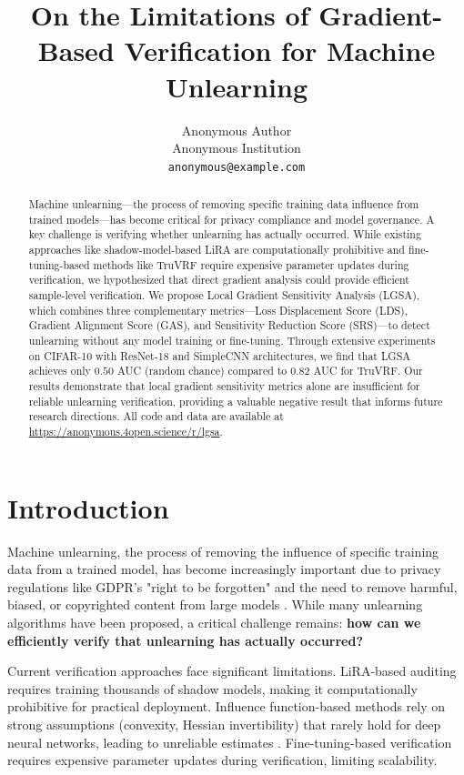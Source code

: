 \documentclass{article}
\title{On the Limitations of Gradient-Based Verification for Machine Unlearning}
\author{%
  Anonymous Author\\
  Anonymous Institution\\
  \texttt{anonymous@example.com}
}
\begin{document}
\maketitle

\begin{abstract}
Machine unlearning---the process of removing specific training data influence from trained models---has become critical for privacy compliance and model governance. A key challenge is verifying whether unlearning has actually occurred. While existing approaches like shadow-model-based LiRA are computationally prohibitive and fine-tuning-based methods like TruVRF require expensive parameter updates during verification, we hypothesized that direct gradient analysis could provide efficient sample-level verification. We propose Local Gradient Sensitivity Analysis (LGSA), which combines three complementary metrics---Loss Displacement Score (LDS), Gradient Alignment Score (GAS), and Sensitivity Reduction Score (SRS)---to detect unlearning without any model training or fine-tuning. Through extensive experiments on CIFAR-10 with ResNet-18 and SimpleCNN architectures, we find that LGSA achieves only $0.50$ AUC (random chance) compared to $0.82$ AUC for TruVRF. Our results demonstrate that local gradient sensitivity metrics alone are insufficient for reliable unlearning verification, providing a valuable negative result that informs future research directions. All code and data are available at \url{https://anonymous.4open.science/r/lgsa}.
\end{abstract}

\section{Introduction}
\label{sec:intro}

Machine unlearning, the process of removing the influence of specific training data from a trained model, has become increasingly important due to privacy regulations like GDPR's "right to be forgotten" and the need to remove harmful, biased, or copyrighted content from large models \cite{bourtoule2021machine}. While many unlearning algorithms have been proposed, a critical challenge remains: \textbf{how can we efficiently verify that unlearning has actually occurred?}

Current verification approaches face significant limitations. LiRA-based auditing \cite{carlini2022membership} requires training thousands of shadow models, making it computationally prohibitive for practical deployment. Influence function-based methods \cite{koh2017understanding} rely on strong assumptions (convexity, Hessian invertibility) that rarely hold for deep neural networks, leading to unreliable estimates \cite{basu2021influence}. Fine-tuning-based verification \cite{zhou2024truvrf} requires expensive parameter updates during verification, limiting scalability.
\end{document}

